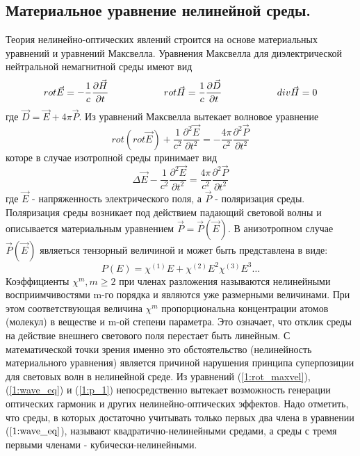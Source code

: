 \subsection{Материальное уравнение нелинейной среды.} 
Теория нелинейно-оптических явлений строится на основе материальных уравнений и уравнений
Максвелла. Уравнения Максвелла для диэлектрической нейтральной немагнитной среды имеют вид
\begin{equation}\label{1:maxvel}
rot\vec{E} = - \frac{ 1 }{ c}\frac{\partial \vec{H} }{\partial t}
\hspace{20mm}
rot\vec{H} =  \frac{ 1 }{ c}\frac{\partial \vec{D} }{\partial t}
\hspace{20mm}
div\vec{H} = 0
\end{equation}
где $ \vec{D} = \vec{E} + 4\pi \vec{P}$. Из уравнений Максвелла вытекает волновое уравнение
\begin{equation}\label{1:rot_maxvel}
rot(rot\vec{E}) + \frac{ 1 }{ c^2 }\frac{\partial^2 \vec{E} }{\partial t^2} = - \frac{ 4\pi }{ c^2 }\frac{\partial^2 \vec{P} }{\partial t^2}
\end{equation}
которе в случае изотропной среды принимает вид
\begin{equation}\label{1:wave_eq}
\Delta\vec{E} - \frac{ 1 }{ c^2 }\frac{\partial^2 \vec{E} }{\partial t^2} =  \frac{ 4\pi }{ c^2 }\frac{\partial^2 \vec{P} }{\partial t^2}
\end{equation}
где $\vec{E}$ - напряженность электрического поля, а $\vec{P}$ - поляризация среды. Поляризация среды возникает под действием падающий световой волны и описывается материальным уравнением $\vec{P} = \vec{P}(\vec{E})$.
В анизотропном случае $\vec{P}(\vec{E})$ являеться тензорный величиной и может быть представлена в виде:
\begin{equation}\label{1:p_1}
P(E) = \chi^{(1)}E + \chi^{(2)}E^2 \chi^{(3)}E^3\dots
\end{equation}
Коэффициенты $\chi^{m}, m \ge 2$ при членах разложения называются нелинейными восприимчивостями m-го порядка и являются уже размерными величинами. При этом соответствующая величина $\chi^{m}$ пропорциональна концентрации атомов (молекул) в веществе и m-ой степени параметра. Это означает, что отклик среды на действие внешнего светового поля перестает быть линейным.  С математической точки зрения именно это обстоятельство (нелинейность материального уравнения) является причиной нарушения принципа суперпозиции для световых волн в нелинейной среде. Из уравнений (\ref{1:rot_maxvel}), (\ref{1:wave_eq}) и (\ref{1:p_1}) непосредственно вытекает возможность генерации оптических гармоник и других нелинейно-оптических эффектов.  Надо отметить, что среды, в которых достаточно учитывать только первых два члена в уравнении ($\ref{1:wave_eq}$), называют квадратично-нелинейными средами, а среды с тремя первыми членами - кубически-нелинейными. 
